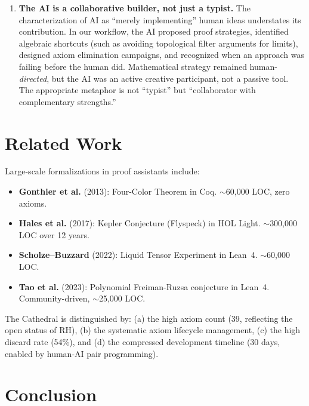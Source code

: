 \documentclass[11pt,a4paper]{article}
\begin{document}
\begin{enumerate}
  \item \textbf{The AI is a collaborative builder, not just a typist.}
    The characterization of AI as ``merely implementing'' human ideas
    understates its contribution. In our workflow, the AI proposed
    proof strategies, identified algebraic shortcuts (such as avoiding
    topological filter arguments for limits), designed axiom elimination
    campaigns, and recognized when an approach was failing before the
    human did. Mathematical strategy remained human-\emph{directed},
    but the AI was an active creative participant, not a passive tool.
    The appropriate metaphor is not ``typist'' but ``collaborator with
    complementary strengths.''
\end{enumerate}

\section{Related Work}

Large-scale formalizations in proof assistants include:

\begin{itemize}
  \item \textbf{Gonthier et al.} (2013): Four-Color Theorem in Coq.
    $\sim$60,000 LOC, zero axioms.
  \item \textbf{Hales et al.} (2017): Kepler Conjecture (Flyspeck)
    in HOL Light. $\sim$300,000 LOC over 12 years.
  \item \textbf{Scholze--Buzzard} (2022): Liquid Tensor Experiment
    in Lean~4. $\sim$60,000 LOC.
  \item \textbf{Tao et al.} (2023): Polynomial Freiman-Ruzsa
    conjecture in Lean~4. Community-driven, $\sim$25,000 LOC.
\end{itemize}

The Cathedral is distinguished by: (a) the high axiom count (39,
reflecting the open status of RH), (b) the systematic axiom
lifecycle management, (c) the high discard rate (54\%), and
(d) the compressed development timeline (30 days, enabled by
human-AI pair programming).

\section{Conclusion}
\end{document}
